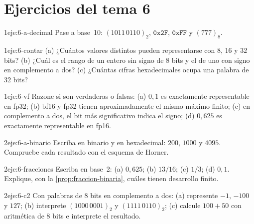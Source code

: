 \section*{Ejercicios del tema 6}

\begin{ejercicio}{1}{eje:6-a-decimal}
Pase a base~10: $(1011\,0110)_2$, $\texttt{0x2F}$, $\texttt{0xFF}$ y $(777)_8$.
\end{ejercicio}

\begin{ejercicio}{1}{eje:6-contar}
(a) ¿Cuántos valores distintos pueden representarse con 8, 16 y 32 bits? (b) ¿Cuál es el rango de un entero sin signo de 8 bits y el de uno con signo en complemento a dos? (c) ¿Cuántas cifras hexadecimales ocupa una palabra de 32 bits?
\end{ejercicio}

\begin{ejercicio}{1}{eje:6-vf}
Razone si son verdaderas o falsas: (a) $0{,}1$ es exactamente representable en fp32; (b) bf16 y fp32 tienen aproximadamente el mismo máximo finito; (c) en complemento a dos, el bit más significativo indica el signo; (d) $0{,}625$ es exactamente representable en fp16.
\end{ejercicio}

\begin{ejercicio}{2}{eje:6-a-binario}
Escriba en binario y en hexadecimal: $200$, $1000$ y $4095$. Compruebe cada resultado con el esquema de Horner.
\end{ejercicio}

\begin{ejercicio}{2}{eje:6-fracciones}
Escriba en base~2: (a) $0{,}625$; (b) $13/16$; (c) $1/3$; (d) $0{,}1$. Explique, con la \cref{prop:fraccion-binaria}, cuáles tienen desarrollo finito.
\end{ejercicio}

\begin{ejercicio}{2}{eje:6-c2}
Con palabras de 8 bits en complemento a dos: (a) represente $-1$, $-100$ y $127$; (b) interprete $(1000\,0001)_2$ y $(1111\,0110)_2$; (c) calcule $100+50$ con aritmética de 8 bits e interprete el resultado.
\end{ejercicio}

